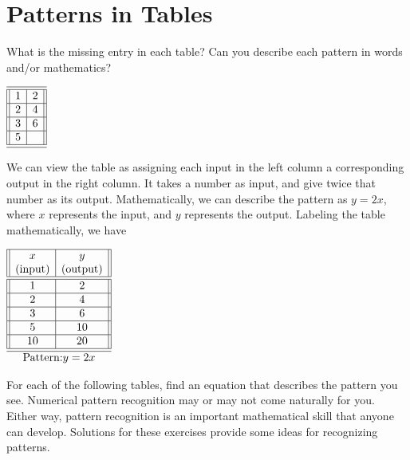 \documentclass[nooutcomes]{ximera}
\begin{document}
\section{Patterns in Tables}
\begin{example}
What is the missing entry in each table? Can you describe each pattern in words and/or mathematics?

\begin{center}
$
\begin{array}{||c|c||}
\hline 
\hline
1&2\\
\hline
2&4\\
\hline
3&6\\
\hline
5& \\
\hline 
\hline
\end{array}
$
\end{center}



 \begin{explanation}
We can view the table as assigning each input in the left column a corresponding output in the right column. It takes a number as input, and give twice that number as its output. Mathematically, we can describe the pattern as $y=2x$, where $x$  represents the input, and $y$ represents the output. Labeling the table mathematically, we have

\begin{center}
$
\begin{array}{||c|c||}
\hline
x&y\\
\text{(input)}&\text{(output)}\\
\hline 
\hline
1&2\\
\hline
2&4\\
\hline
3&6\\
\hline
5&10\\
\hline
10&20\\
\hline 
\hline
\multicolumn{2}{c}{\text{Pattern:}y=2x}\\
\end{array}
$
\end{center}



\end{explanation}
\end{example}

For each of the following tables, find an equation that describes the pattern you see. Numerical pattern recognition may or may not come naturally for you. Either way, pattern recognition is an important mathematical skill that anyone can develop. Solutions for these exercises provide some ideas for recognizing patterns.
\end{document}
